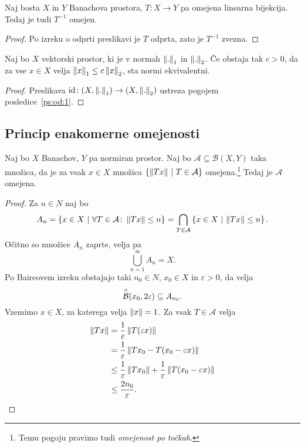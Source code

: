 \begin{posledica}\label{ps:od:1}
Naj bosta $X$ in $Y$ Banachova prostora, $T \colon X \to Y$ pa
omejena linearna bijekcija. Tedaj je tudi $T^{-1}$ omejen.
\end{posledica}

\begin{proof}
Po izreku o odprti preslikavi je $T$ odprta, zato je $T^{-1}$
zvezna.
\end{proof}

\begin{posledica}
Naj bo $X$ vektorski prostor, ki je v normah $\left\lVert .\right\rVert_1$ in
$\left\lVert .\right\rVert_2$. Če obstaja tak $c > 0$, da za vse $x \in X$ velja
$\left\lVert x\right\rVert_1 \leq c \left\lVert x\right\rVert_2$, sta normi ekvivalentni.
\end{posledica}

\begin{proof}
Preslikava $\operatorname{id} \colon (X, \left\lVert .\right\rVert_1) \to (X, \left\lVert .\right\rVert_2)$ ustreza
pogojem posledice~\ref{ps:od:1}.
\end{proof}

\newpage

\subsection{Princip enakomerne omejenosti}

\begin{izrek}
\label{iz:bs:1}
Naj bo $X$ Banachov, $Y$ pa normiran prostor. Naj bo
$\mathcal{A} \subseteq \mathcal{B}(X,Y)$ taka množica, da je za
vsak $x \in X$ množica $\left\{\left\lVert Tx\right\rVert~\middle\vert~T \in \mathcal{A}\right\}$
omejena.\footnote{Temu pogoju pravimo tudi \emph{omejenost po
točkah}.} Tedaj je $\mathcal{A}$ omejena.
\end{izrek}

\begin{proof}
Za $n \in N$ naj bo
\[
A_n = 
\left\{x \in X~\middle\vert~\forall T \in \mathcal{A} \colon \left\lVert Tx\right\rVert \leq n\right\} =
\bigcap_{T \in \mathcal{A}} \left\{x \in X~\middle\vert~\left\lVert Tx\right\rVert \leq n\right\}.
\]
Očitno so množice $A_n$ zaprte, velja pa
\[
\bigcup_{n=1}^\infty A_n = X.
\]
Po Baireovem izreku obstajajo taki $n_0 \in N$, $x_0 \in X$ in
$\varepsilon > 0$, da velja
\[
\overset{\circ}{\mathcal{B}}(x_0, 2\varepsilon) \subseteq A_{n_0}.
\]
Vzemimo $x \in X$, za katerega velja $\left\lVert x\right\rVert = 1$. Za vsak
$T \in \mathcal{A}$ velja
\begin{align*}
\left\lVert Tx\right\rVert &= \frac{1}{\varepsilon} \left\lVert T(\varepsilon x)\right\rVert
\\
&= \frac{1}{\varepsilon} \left\lVert Tx_0 - T(x_0 - \varepsilon x)\right\rVert
\\
&\leq \frac{1}{\varepsilon} \left\lVert Tx_0\right\rVert +
\frac{1}{\varepsilon} \left\lVert T(x_0 - \varepsilon x)\right\rVert
\\
&\leq \frac{2n_0}{\varepsilon}. \qedhere
\end{align*}
\end{proof}

